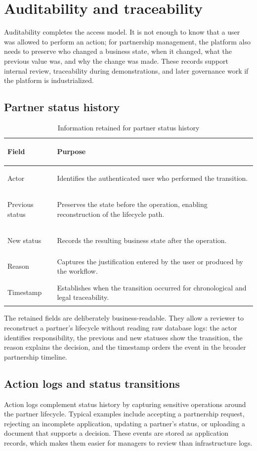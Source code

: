 \section{Auditability and traceability}
Auditability completes the access model. It is not enough to know that a user was allowed to perform an action; for partnership management, the platform also needs to preserve who changed a business state, when it changed, what the previous value was, and why the change was made. These records support internal review, traceability during demonstrations, and later governance work if the platform is industrialized.
\subsection{Partner status history}
\begin{table}[H]
  \centering
  \caption{Information retained for partner status history}
  \begin{tabularx}{\textwidth}{>{\bfseries\raggedright\arraybackslash}p{3.2cm}X}
    \toprule
    Field & Purpose \\
    \midrule
    Actor & Identifies the authenticated user who performed the transition. \\
    Previous status & Preserves the state before the operation, enabling reconstruction of the lifecycle path. \\
    New status & Records the resulting business state after the operation. \\
    Reason & Captures the justification entered by the user or produced by the workflow. \\
    Timestamp & Establishes when the transition occurred for chronological and legal traceability. \\
    \bottomrule
  \end{tabularx}
\end{table}
The retained fields are deliberately business-readable. They allow a reviewer to reconstruct a partner's lifecycle without reading raw database logs: the actor identifies responsibility, the previous and new statuses show the transition, the reason explains the decision, and the timestamp orders the event in the broader partnership timeline.
\subsection{Action logs and status transitions}
Action logs complement status history by capturing sensitive operations around the partner lifecycle. Typical examples include accepting a partnership request, rejecting an incomplete application, updating a partner's status, or uploading a document that supports a decision. These events are stored as application records, which makes them easier for managers to review than infrastructure logs.

